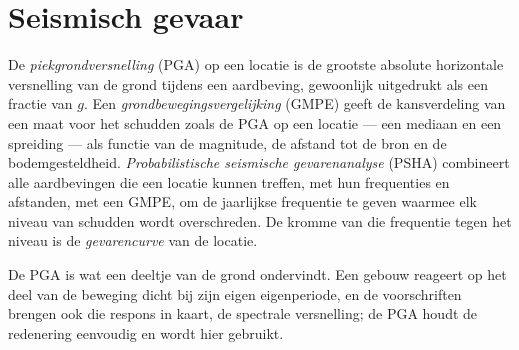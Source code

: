 \section{Seismisch gevaar}\label{sec:b2:geological-hazards:seismic}

\begin{definition}\label{def:b2:geological-hazards:psha}
De \emph{piekgrondversnelling} (PGA) op een locatie is de grootste
absolute horizontale versnelling van de grond tijdens een aardbeving, gewoonlijk uitgedrukt als een
fractie van $g$. Een \emph{grondbewegingsvergelijking}
(GMPE) geeft de kansverdeling van een maat voor het schudden zoals de PGA op een
locatie --- een mediaan en een spreiding --- als functie van de magnitude, de afstand tot de bron
en de bodemgesteldheid. \emph{Probabilistische seismische gevarenanalyse}
(PSHA) combineert alle aardbevingen die een locatie kunnen treffen, met hun
frequenties en afstanden, met een GMPE, om de jaarlijkse frequentie te geven waarmee elk niveau van schudden wordt
overschreden. De kromme van die frequentie tegen het niveau is de
\emph{gevarencurve} van de locatie.
\end{definition}

De PGA is wat een deeltje van de grond ondervindt. Een gebouw reageert op het deel van de
beweging dicht bij zijn eigen eigenperiode, en de voorschriften brengen ook die respons in kaart, de spectrale versnelling;
de PGA houdt de redenering eenvoudig en wordt hier gebruikt.

